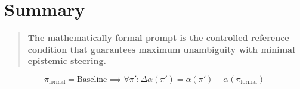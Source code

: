 \documentclass[11pt,a4paper]{article}
\begin{document}
\section{Summary}

\begin{quote}
\textbf{The mathematically formal prompt is the controlled reference condition that guarantees maximum unambiguity with minimal epistemic steering.}
\end{quote}

\begin{equation}
\boxed{\pi_{\text{formal}} = \text{Baseline} \implies \forall \pi': \Delta\alpha(\pi') = \alpha(\pi') - \alpha(\pi_{\text{formal}})}
\end{equation}
\end{document}
